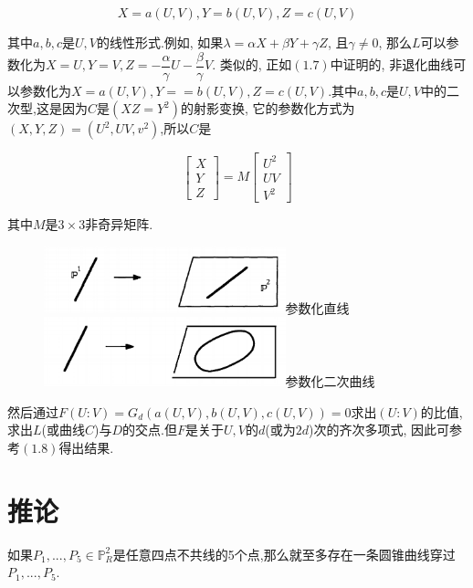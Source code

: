 \documentclass[UTF8]{book}
\begin{document}
		\begin{equation*}
			X=a(U,V), Y=b(U,V), Z=c(U,V)
		\end{equation*}
	
		其中$ a,b,c $是$ U,V $的线性形式.例如, 如果$\lambda=\alpha X+\beta Y+\gamma Z$, 且$\gamma \neq 0$, 那么$ L $可以参数化为$ X=U,Y=V, Z=-\dfrac{\alpha}{\gamma}U-\dfrac{\beta}{\gamma}V$. 类似的, 正如$ (1.7) $中证明的, 非退化曲线可以参数化为$ X=a(U,V), Y==b(U,V),Z=c(U,V) $.其中$ a,b,c $是$ U,V $中的二次型,这是因为$ C $是$(XZ=Y^{2})$的射影变换, 它的参数化方式为$ (X,Y,Z)=(U^{2},UV,v^{2})$,所以$ C $是
		
		\begin{equation*}
		 \begin{bmatrix} X \\Y\\ Z\end{bmatrix}=M\begin{bmatrix} U^{2} \\UV\\ V^{2}\end{bmatrix}
		\end{equation*}
	
		其中$ M $是$ 3\times3 $非奇异矩阵.
	
		\begin{figure}[H]
		  \centering
		  \includegraphics[width=7cm]{1811.jpg}参数化直线\\
		  \includegraphics[width=7cm]{1822.jpg}参数化二次曲线\\
		\end{figure}
	
		然后通过$F(U:V)=G_{d}(a(U,V),b(U,V),c(U,V))=0$求出$ (U:V) $的比值, 求出$ L $(或曲线$ C $)与$ D $的交点.但$ F $是关于$ U,V $的$ d $(或为$ 2d $)次的齐次多项式, 因此可参考$ (1.8) $得出结果.

	\section{推论}
		如果$P_{1},...,P_{5} \in \mathbb{P}^{2}_{R}$是任意四点不共线的5个点,那么就至多存在一条圆锥曲线穿过$P_{1},...,P_{5}$.
		
\end{document}
